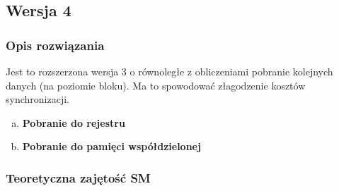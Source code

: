 
\subsection{Wersja 4}

\subsubsection{Opis rozwiązania}

Jest to rozszerzona wersja 3 o równoległe z obliczeniami pobranie kolejnych danych (na poziomie bloku). Ma to spowodować złagodzenie kosztów synchronizacji.

\begin{enumerate}[(a)]

\item \textbf{Pobranie do rejestru} \newline



\item \textbf{Pobranie do pamięci współdzielonej} \newline



\end{enumerate}

\subsubsection{Teoretyczna zajętość SM}

